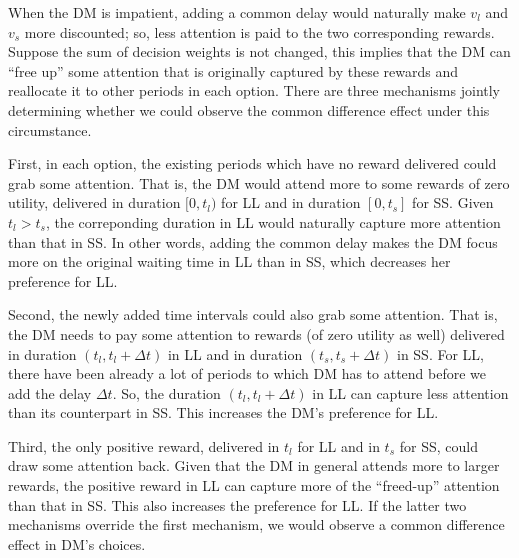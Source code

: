 \documentclass[
  12pt,
]{article}
\begin{document}
When the DM is impatient, adding a common delay would naturally make
\(v_l\) and \(v_s\) more discounted; so, less attention is paid to the
two corresponding rewards. Suppose the sum of decision weights is not
changed, this implies that the DM can ``free up'' some attention that is
originally captured by these rewards and reallocate it to other periods
in each option. There are three mechanisms jointly determining whether
we could observe the common difference effect under this circumstance.

First, in each option, the existing periods which have no reward
delivered could grab some attention. That is, the DM would attend more
to some rewards of zero utility, delivered in duration \([0,t_l)\) for
LL and in duration \([0,t_s]\) for SS. Given \(t_l >t_s\), the
correponding duration in LL would naturally capture more attention than
that in SS. In other words, adding the common delay makes the DM focus
more on the original waiting time in LL than in SS, which decreases her
preference for LL.

Second, the newly added time intervals could also grab some attention.
That is, the DM needs to pay some attention to rewards (of zero utility
as well) delivered in duration \((t_l,t_l+\Delta t)\) in LL and in
duration \((t_s, t_s+\Delta t)\) in SS. For LL, there have been already
a lot of periods to which DM has to attend before we add the delay
\(\Delta t\). So, the duration \((t_l,t_l+\Delta t)\) in LL can capture
less attention than its counterpart in SS. This increases the DM's
preference for LL.

Third, the only positive reward, delivered in \(t_l\) for LL and in
\(t_s\) for SS, could draw some attention back. Given that the DM in
general attends more to larger rewards, the positive reward in LL can
capture more of the ``freed-up'' attention than that in SS. This also
increases the preference for LL. If the latter two mechanisms override
the first mechanism, we would observe a common difference effect in DM's
choices.
\end{document}
